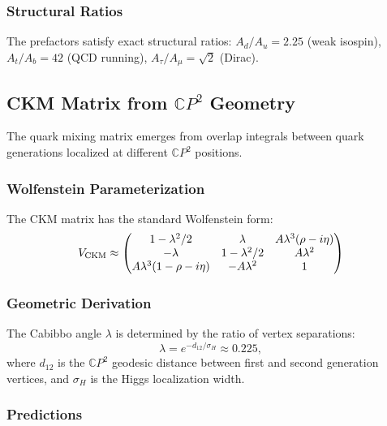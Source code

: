 \subsubsection{Structural Ratios}

The prefactors satisfy exact structural ratios:
$A_d/A_u = 2.25$ (weak isospin), $A_t/A_b = 42$ (QCD running), $A_\tau/A_\mu = \sqrt{2}$ (Dirac).

\subsection{CKM Matrix from $\mathbb{C}P^2$ Geometry}\label{sec:ckm-matrix}

The quark mixing matrix emerges from overlap integrals between quark generations 
localized at different $\mathbb{C}P^2$ positions.

\subsubsection{Wolfenstein Parameterization}

The CKM matrix has the standard Wolfenstein form:
\begin{equation}
V_{\rm CKM} \approx \begin{pmatrix} 
1 - \lambda^2/2 & \lambda & A\lambda^3(\rho - i\eta) \\
-\lambda & 1 - \lambda^2/2 & A\lambda^2 \\
A\lambda^3(1 - \rho - i\eta) & -A\lambda^2 & 1
\end{pmatrix}
\end{equation}

\subsubsection{Geometric Derivation}

The Cabibbo angle $\lambda$ is determined by the ratio of vertex separations:
\begin{equation}
\lambda = e^{-d_{12}/\sigma_H} \approx 0.225,
\end{equation}
where $d_{12}$ is the $\mathbb{C}P^2$ geodesic distance between first and second 
generation vertices, and $\sigma_H$ is the Higgs localization width.

\subsubsection{Predictions}

